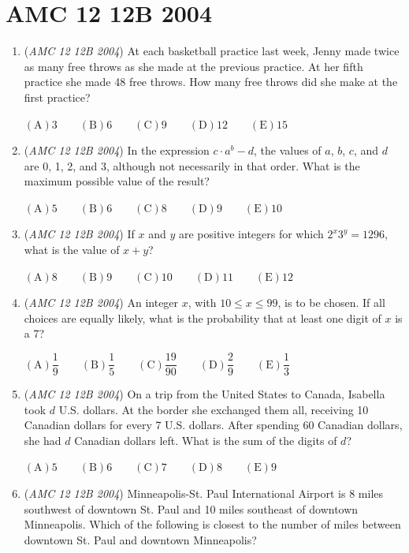 \section{AMC 12 12B 2004}
        \begin{enumerate}
        	\item (\textit{AMC 12 12B 2004}) At each basketball practice last week, Jenny made twice as many free throws as she made at the previous practice. At her fifth practice she made 48 free throws. How many free throws did she make at the first practice? 


 $(\mathrm {A}) 3\qquad (\mathrm {B}) 6 \qquad (\mathrm {C}) 9 \qquad (\mathrm {D}) 12 \qquad (\mathrm {E}) 15$


	\item (\textit{AMC 12 12B 2004}) In the expression $c\cdot a^b-d$, the values of $a$, $b$, $c$, and $d$ are 0, 1, 2, and 3, although not necessarily in that order. What is the maximum possible value of the result?


 $(\mathrm {A}) 5\qquad (\mathrm {B}) 6 \qquad (\mathrm {C}) 8 \qquad (\mathrm {D}) 9 \qquad (\mathrm {E}) 10$


	\item (\textit{AMC 12 12B 2004}) If $x$ and $y$ are positive integers for which $2^x3^y=1296$, what is the value of $x+y$?


 $(\mathrm {A}) 8\qquad (\mathrm {B}) 9 \qquad (\mathrm {C}) 10 \qquad (\mathrm {D}) 11 \qquad (\mathrm {E}) 12$


	\item (\textit{AMC 12 12B 2004}) An integer $x$, with $10\leq x\leq 99$, is to be chosen. If all choices are equally likely, what is the probability that at least one digit of $x$ is a 7?


 $(\mathrm {A}) \dfrac{1}{9} \qquad (\mathrm {B}) \dfrac{1}{5} \qquad (\mathrm {C}) \dfrac{19}{90} \qquad (\mathrm {D}) \dfrac{2}{9} \qquad (\mathrm {E}) \dfrac{1}{3}$


	\item (\textit{AMC 12 12B 2004}) On a trip from the United States to Canada, Isabella took $d$ U.S. dollars. At the border she exchanged them all, receiving 10 Canadian dollars for every 7 U.S. dollars. After spending 60 Canadian dollars, she had $d$ Canadian dollars left. What is the sum of the digits of $d$? 


 $(\mathrm {A}) 5\qquad (\mathrm {B}) 6 \qquad (\mathrm {C}) 7 \qquad (\mathrm {D}) 8 \qquad (\mathrm {E}) 9$


	\item (\textit{AMC 12 12B 2004}) Minneapolis-St. Paul International Airport is 8 miles southwest of downtown St. Paul and 10 miles southeast of downtown Minneapolis. Which of the following is closest to the number of miles between downtown St. Paul and downtown Minneapolis? 



\end{enumerate}

